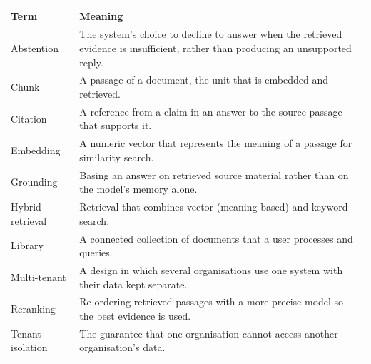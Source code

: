 \begin{table}[H]
  \centering
  \small
  \begin{tabularx}{\textwidth}{@{}p{}X@{}}
    \toprule
    \textbf{Term} & \textbf{Meaning} \\
    \midrule
    Abstention & The system's choice to decline to answer when the retrieved
                 evidence is insufficient, rather than producing an unsupported reply. \\
    Chunk      & A passage of a document, the unit that is embedded and retrieved. \\
    Citation   & A reference from a claim in an answer to the source passage that supports it. \\
    Embedding  & A numeric vector that represents the meaning of a passage for similarity search. \\
    Grounding  & Basing an answer on retrieved source material rather than on the model's memory alone. \\
    Hybrid retrieval & Retrieval that combines vector (meaning-based) and keyword search. \\
    Library    & A connected collection of documents that a user processes and queries. \\
    Multi-tenant & A design in which several organisations use one system with their data kept separate. \\
    Reranking  & Re-ordering retrieved passages with a more precise model so the best evidence is used. \\
    Tenant isolation & The guarantee that one organisation cannot access another organisation's data. \\
    \bottomrule
  \end{tabularx}
\end{table}
